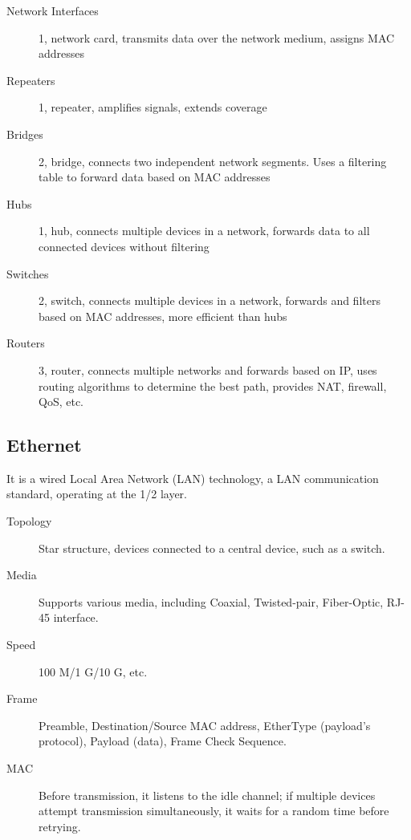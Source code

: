 \documentclass[11pt,journal,compsoc]{IEEEtran}
\begin{document}
\begin{description}
    \item[Network Interfaces] 1, network card, transmits data over the network medium, assigns MAC addresses
    
    \item[Repeaters] 1, repeater, amplifies signals, extends coverage
    
    \item[Bridges] 2, bridge, connects two independent network segments. Uses a filtering table to forward data based on MAC addresses
    
    \item[Hubs] 1, hub, connects multiple devices in a network, forwards data to all connected devices without filtering
    
    \item[Switches] 2, switch, connects multiple devices in a network, forwards and filters based on MAC addresses, more efficient than hubs
    
    \item[Routers] 3, router, connects multiple networks and forwards based on IP, uses routing algorithms to determine the best path, provides NAT, firewall, QoS, etc.
\end{description}


\subsection{Ethernet}

It is a wired Local Area Network (LAN) technology, a LAN communication standard, operating at the 1/2 layer.

\begin{description}
    \item[Topology] Star structure, devices connected to a central device, such as a switch.
    
    \item[Media] Supports various media, including Coaxial, Twisted-pair, Fiber-Optic, RJ-45 interface.
    
    \item[Speed] 100 M/1 G/10 G, etc.
    
    \item[Frame] Preamble, Destination/Source MAC address, EtherType (payload's protocol), Payload (data), Frame Check Sequence.
    
    \item[MAC] Before transmission, it listens to the idle channel; if multiple devices attempt transmission simultaneously, it waits for a random time before retrying.
\end{description}
\end{document}
